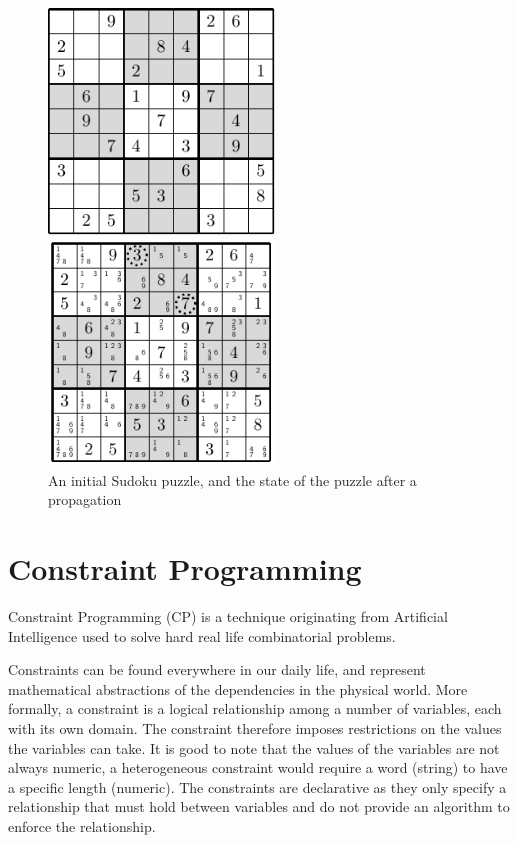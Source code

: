 \documentclass{l4proj}
\begin{document}
\begin{figure}[H]
\begin{center}
\begin{minipage}{6cm}
\includegraphics[height=6cm]{sudokugrid.pdf}
\end{minipage}
\hspace{2.5cm}
\begin{minipage}{6cm}
\includegraphics[trim=0.075cm 0.075cm 0.075cm 0.075cm, height=6cm]{sudokugrid2.pdf}
\end{minipage}
\caption{An initial Sudoku puzzle, and the state of the puzzle after a propagation}
\label{sudokugrid1}
\end{center}
\end{figure}

\section{Constraint Programming}
\noindent Constraint Programming (CP) is a technique originating from Artificial Intelligence used to solve hard real life combinatorial problems.

\noindent Constraints can be found everywhere in our daily life, and represent mathematical abstractions of the dependencies in the physical world. More formally, a constraint is a logical relationship among a number of variables, each with its own domain. The constraint therefore imposes restrictions on the values the variables can take. It is good to note that the values of the variables are not always numeric, a heterogeneous constraint would require a word (string) to have a specific length (numeric). The constraints are declarative as they only specify a relationship that must hold between variables and do not provide an algorithm to enforce the relationship.
\end{document}
